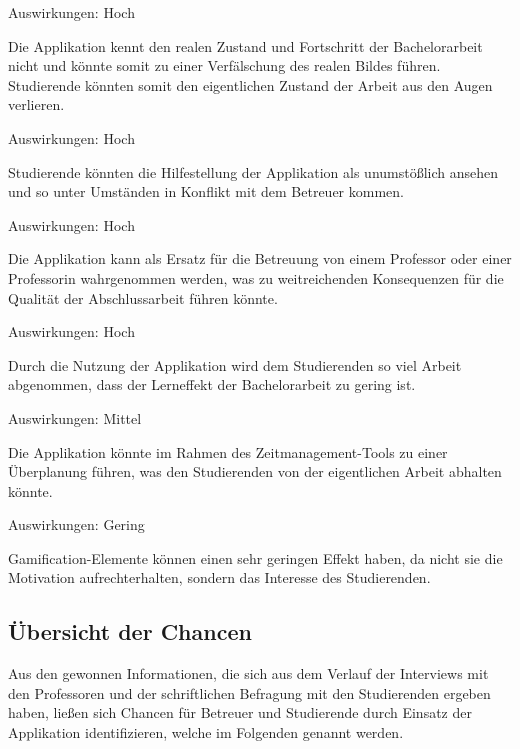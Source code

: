 \documentclass[bibliography=totoc,listof=totoc,BCOR=5mm,DIV=12,oneside]{scrbook}
\begin{document}
\begin{enumerate} [label=\textit{[R\arabic*]}]
\item \label{risk:realerZustand} 
\par Auswirkungen: Hoch
\par Die Applikation kennt den realen Zustand und Fortschritt der Bachelorarbeit nicht und könnte somit zu einer Verfälschung des realen Bildes führen. Studierende könnten somit den eigentlichen Zustand der Arbeit aus den Augen verlieren.
\item \label{risk:inhaltUnumstoesslich} 
\par Auswirkungen: Hoch
\par Studierende könnten die Hilfestellung der Applikation als unumstößlich ansehen und so unter Umständen in Konflikt mit dem Betreuer kommen.
\item \label{risk:erstazBetreuer} 
\par Auswirkungen: Hoch
\par Die Applikation kann als Ersatz für die Betreuung von einem Professor oder einer Professorin wahrgenommen werden, was zu weitreichenden Konsequenzen für die Qualität der Abschlussarbeit führen könnte.
\item \label{risk:keinLerneffekt} 
\par Auswirkungen: Hoch
\par Durch die Nutzung der Applikation wird dem Studierenden so viel Arbeit abgenommen, dass der Lerneffekt der Bachelorarbeit zu gering ist.
\item \label{risk:ueberplanung} 
\par Auswirkungen: Mittel
\par Die Applikation könnte im Rahmen des Zeitmanagement-Tools zu einer Überplanung führen, was den Studierenden von der eigentlichen Arbeit abhalten könnte.
\item \label{risk:gamificationEffekt} 
\par Auswirkungen: Gering
\par Gamification-Elemente können einen sehr geringen Effekt haben, da nicht sie die Motivation aufrechterhalten, sondern das Interesse des Studierenden.
\end{enumerate}

\newpage
\subsection{Übersicht der Chancen} \label{sub:chancenuebersicht}
\par Aus den gewonnen Informationen, die sich aus dem Verlauf der Interviews mit den Professoren und der schriftlichen Befragung mit den Studierenden ergeben haben, ließen sich Chancen für Betreuer und Studierende durch Einsatz der Applikation identifizieren, welche im Folgenden genannt werden.
\end{document}
